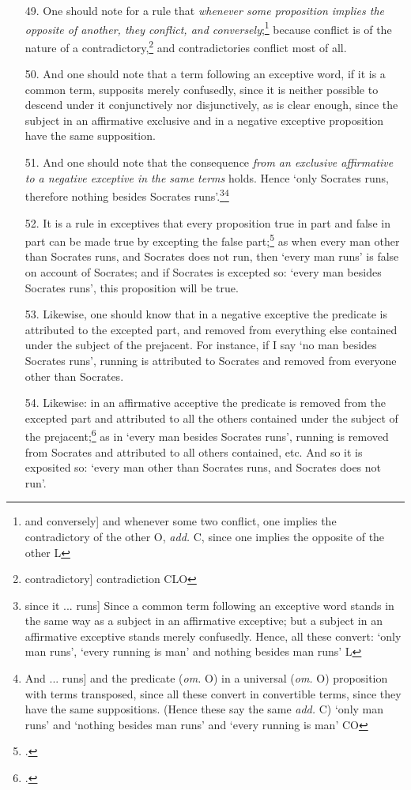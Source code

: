 \begin{itemize}
\item[49.] One should note for a rule that \textit{whenever some proposition implies the opposite of another, they conflict, and conversely};\footnote{and conversely] and whenever some two conflict, one implies the contradictory of the other O, \textit{add.} C, since one implies the opposite of the other L} because conflict is of the nature of a contradictory,\footnote{contradictory] contradiction CLO} and contradictories conflict most of all.
\item[50.] And one should note that a term following an exceptive word, if it is a common term, supposits merely confusedly, since it is neither possible to descend under it conjunctively nor disjunctively, as is clear enough, since the subject in an affirmative exclusive and in a negative exceptive proposition have the same supposition.
\item[51.] And one should note that the consequence \textit{from an exclusive affirmative to a negative exceptive in the same terms} holds. Hence `only Socrates runs, therefore nothing besides Socrates runs'.\footnote{since it ... runs] Since a common term following an exceptive word stands in the same way as a subject in an affirmative exceptive; but a subject in an affirmative exceptive stands merely confusedly. Hence, all these convert: `only man runs', `every running is man' and nothing besides man runs' L}\footnote{And ... runs] and the predicate (\textit{om.} O) in a universal (\textit{om.} O) proposition with terms transposed, since all these convert in convertible terms, since they have the same suppositions. (Hence these say the same \textit{add.} C) `only man runs' and `nothing besides man runs' and `every running is man' CO}
\item[52.] It is a rule in exceptives that every proposition true in part and false in part can be made true by excepting the false part;\footnote{\cite[p. 166.13]{BurleyDPAL}.} as when every man other than Socrates runs, and Socrates does not run, then `every man runs' is false on account of Socrates; and if Socrates is excepted so: `every man besides Socrates runs', this proposition will be true.
\item[53.] Likewise, one should know that in a negative exceptive the predicate is attributed to the excepted part, and removed from everything else contained under the subject of the prejacent. For instance, if I say `no man besides Socrates runs', running is attributed to Socrates and removed from everyone other than Socrates.
\item[54.] Likewise: in an affirmative acceptive the predicate is removed from the excepted part and attributed to all the others contained under the subject of the prejacent;\footnote{\cite[p. 166.34]{BurleyDPAL}.} as in `every man besides Socrates runs', running is removed from Socrates and attributed to all others contained, etc. And so it is exposited so: `every man other than Socrates runs, and Socrates does not run'.

\end{itemize}
